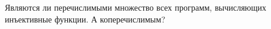 Являются ли перечислимыми множество всех программ, вычисляющих инъективные функции. А коперечислимым?
